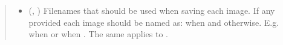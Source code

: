 \documentclass[letterpaper,10pt,english]{sphinxmanual}
\begin{document}
\begin{fulllineitems}
\begin{quote}
\begin{description}
\begin{itemize}
\item {} 
 (, ) \textendash{} Filenames that should be used when saving each image. If any provided each image should be named as:
 when  and  otherwise. E.g.  when  or
 when .  The same applies to .

\end{itemize}

\end{description}\end{quote}

\end{fulllineitems}

\end{document}

